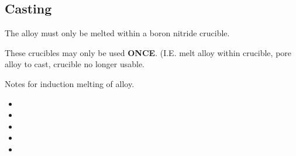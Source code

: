 \subsection{Casting}

The \MgZnCa alloy must only be melted within a boron nitride crucible. 

These crucibles may only be used \textbf{ONCE}. (I.E. melt alloy within crucible, pore alloy to cast, crucible no longer usable. 

Notes for induction melting of \MgZnCa alloy.
\begin{itemize}
\item 
\item 
\item 
\item
\item 
\end{itemize}